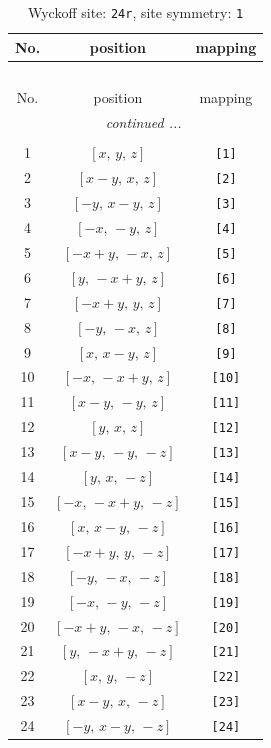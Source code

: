\documentclass[fleqn,8pt]{jsarticle}
\begin{document}
\begin{longtable}{ccc}
\caption{Wyckoff site: {\tt 24r}, site symmetry: {\tt 1}}
 \\
 \hline \hline
No. & position & mapping \\ \hline \endfirsthead

\multicolumn{2}{l}{\tablename\ \thetable{}} \\
 \hline \hline
No. & position & mapping \\ \hline \endhead

 \hline \hline
\multicolumn{2}{r}{\footnotesize\it continued ...} \\ \endfoot

 \hline \hline
\multicolumn{2}{r}{} \\ \endlastfoot

1 & $\left[ x,\, y,\, z \right]$ & {\tt [1]} \\ \hline
2 & $\left[ x - y,\, x,\, z \right]$ & {\tt [2]} \\ \hline
3 & $\left[ - y,\, x - y,\, z \right]$ & {\tt [3]} \\ \hline
4 & $\left[ - x,\, - y,\, z \right]$ & {\tt [4]} \\ \hline
5 & $\left[ - x + y,\, - x,\, z \right]$ & {\tt [5]} \\ \hline
6 & $\left[ y,\, - x + y,\, z \right]$ & {\tt [6]} \\ \hline
7 & $\left[ - x + y,\, y,\, z \right]$ & {\tt [7]} \\ \hline
8 & $\left[ - y,\, - x,\, z \right]$ & {\tt [8]} \\ \hline
9 & $\left[ x,\, x - y,\, z \right]$ & {\tt [9]} \\ \hline
10 & $\left[ - x,\, - x + y,\, z \right]$ & {\tt [10]} \\ \hline
11 & $\left[ x - y,\, - y,\, z \right]$ & {\tt [11]} \\ \hline
12 & $\left[ y,\, x,\, z \right]$ & {\tt [12]} \\ \hline
13 & $\left[ x - y,\, - y,\, - z \right]$ & {\tt [13]} \\ \hline
14 & $\left[ y,\, x,\, - z \right]$ & {\tt [14]} \\ \hline
15 & $\left[ - x,\, - x + y,\, - z \right]$ & {\tt [15]} \\ \hline
16 & $\left[ x,\, x - y,\, - z \right]$ & {\tt [16]} \\ \hline
17 & $\left[ - x + y,\, y,\, - z \right]$ & {\tt [17]} \\ \hline
18 & $\left[ - y,\, - x,\, - z \right]$ & {\tt [18]} \\ \hline
19 & $\left[ - x,\, - y,\, - z \right]$ & {\tt [19]} \\ \hline
20 & $\left[ - x + y,\, - x,\, - z \right]$ & {\tt [20]} \\ \hline
21 & $\left[ y,\, - x + y,\, - z \right]$ & {\tt [21]} \\ \hline
22 & $\left[ x,\, y,\, - z \right]$ & {\tt [22]} \\ \hline
23 & $\left[ x - y,\, x,\, - z \right]$ & {\tt [23]} \\ \hline
24 & $\left[ - y,\, x - y,\, - z \right]$ & {\tt [24]} \\
\end{longtable}
\end{document}
